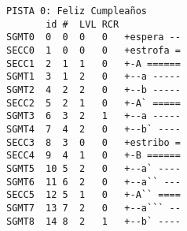 \begin{verbatim}
PISTA 0: Feliz Cumpleaños 
       id #  LVL RCR
SGMT0  0  0  0   0   +espera --
SECC0  1  0  0   0   +estrofa =
SECC1  2  1  1   0   +-A ======
SGMT1  3  1  2   0   +--a -----
SGMT2  4  2  2   0   +--b -----
SECC2  5  2  1   0   +-A` =====
SGMT3  6  3  2   1   +--a -----
SGMT4  7  4  2   0   +--b` ----
SECC3  8  3  0   0   +estribo =
SECC4  9  4  1   0   +-B ======
SGMT5  10 5  2   0   +--a` ----
SGMT6  11 6  2   0   +--a`` ---
SECC5  12 5  1   0   +-A`` ====
SGMT7  13 7  2   0   +--a``` --
SGMT8  14 8  2   1   +--b` ----
\end{verbatim}

